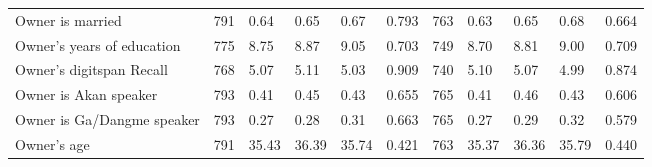 \documentclass{report}
\begin{document}
\begin{table}[H]
{\begin{tabular}{lllllllllll}
\hspace{1em}Owner is married & 791 & 0.64 & 0.65 & 0.67 & 0.793 & 763 & 0.63 & 0.65 & 0.68 & 0.664\\
\hspace{1em}Owner's years of education & 775 & 8.75 & 8.87 & 9.05 & 0.703 & 749 & 8.70 & 8.81 & 9.00 & 0.709\\
\hspace{1em}Owner's digitspan Recall & 768 & 5.07 & 5.11 & 5.03 & 0.909 & 740 & 5.10 & 5.07 & 4.99 & 0.874\\
\hspace{1em}Owner is Akan speaker & 793 & 0.41 & 0.45 & 0.43 & 0.655 & 765 & 0.41 & 0.46 & 0.43 & 0.606\\
\hspace{1em}Owner is Ga/Dangme speaker & 793 & 0.27 & 0.28 & 0.31 & 0.663 & 765 & 0.27 & 0.29 & 0.32 & 0.579\\
\hspace{1em}Owner's age & 791 & 35.43 & 36.39 & 35.74 & 0.421 & 763 & 35.37 & 36.36 & 35.79 & 0.440\\
\bottomrule
\end{tabular}}
\end{table}
\end{document}
